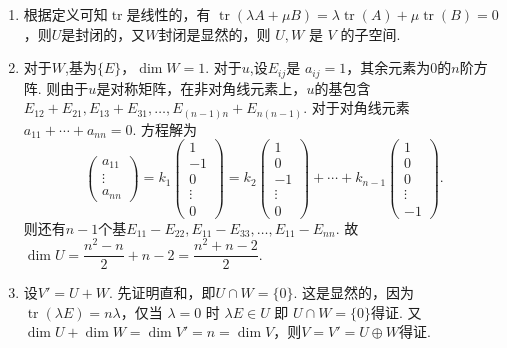 \documentclass[UTF8,12pt,a4paper,fontset=fandol]{ctexart}
\begin{document}
\begin{solve}
\begin{enumerate}
                \item 根据定义可知$\operatorname{tr}$是线性的，有 $\operatorname{tr}(\lambda A+\mu B)=\lambda\operatorname{tr}(A)+\mu\operatorname{tr}(B)=0$，则$U$是封闭的，又$W$封闭是显然的，则 $U,W$ 是 $V$ 的子空间.

                \item 对于$W$,基为$\{E\}$，$\dim W=1$. 对于$u$,设$E_{ij}$是 $a_{ij}=1$，其余元素为0的$n$阶方阵. 则由于$u$是对称矩阵，在非对角线元素上，$u$的基包含$E_{12}+E_{21},E_{13}+E_{31},\ldots ,E_{(n-1)n}+E_{n(n-1)}$. 对于对角线元素 $a_{11}+\cdots +a_{nn}=0$. 方程解为
                      \[\begin{pmatrix}a_{11}\\ \vdots\\ a_{nn}	\end{pmatrix}=k_1\begin{pmatrix}1 \\ -1 \\ 0\\ \vdots \\0	\end{pmatrix}=k_2\begin{pmatrix}1 \\ 0 \\ -1\\ \vdots \\0	\end{pmatrix}+\cdots+k_{n-1}\begin{pmatrix}1 \\ 0 \\ 0\\ \vdots \\-1	\end{pmatrix}.\]
                      则还有$n-1$个基$E_{11}-E_{22},E_{11}-E_{33},\ldots ,E_{11}-E_{nn}$. 故 $\dim U=\dfrac{n^2-n}2+n-2=\dfrac{n^2+n-2}2$.

                \item 设$V'=U+W$. 先证明直和，即$U\cap W=\{0\}$. 这是显然的，因为$\operatorname{tr}(\lambda E)=n\lambda$，仅当 $\lambda=0$ 时 $\lambda E\in U$ 即 $U\cap W=\{0\}$得证. 又$\dim U+\dim W=\dim V'=n=\dim V$，则$V=V'=U\oplus W$得证.
            \end{enumerate}
\end{solve}
\end{document}
